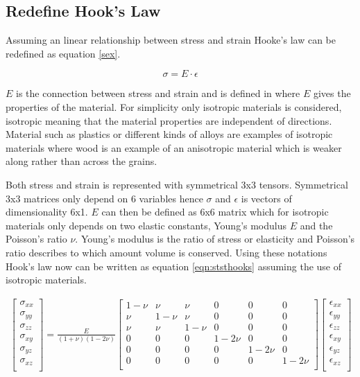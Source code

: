 \documentclass[10pt,a4paper]{article}
\begin{document}
\subsection{Redefine Hook's Law}
Assuming an linear relationship between stress and strain Hooke's law can be redefined as equation \ref{sex}.

\begin{equation}\label{sex}
    \sigma = E \cdot \epsilon
\end{equation}

 $E$ is the connection between stress and strain and is defined in \cite{fem_liu} where $E$ gives the properties of the material. For simplicity only isotropic materials is considered, isotropic meaning that the material properties are independent of directions. Material such as plastics or different kinds of alloys are examples of isotropic materials where wood is an example of an anisotropic material which is weaker along rather than across the grains.

Both stress and strain is represented with symmetrical 3x3 tensors. Symmetrical 3x3 matrices only depend on 6 variables hence
$\sigma$ and $\epsilon$ is vectors of dimensionality 6x1. $E$ can then be defined as 6x6 matrix which for isotropic materials only depends on two elastic constants, Young's modulus $E$ and the Poisson's ratio $\nu$. Young's modulus is the ratio of stress or elasticity and Poisson's ratio describes to which amount volume is conserved. Using these notations Hook's law now can be written as equation \ref{eqn:ststhooks} assuming the use of isotropic materials.

\begin{eqnarray}\label{eqn:ststhooks}
\left[ \begin{array}{c}
\sigma_{xx} \\
\sigma_{yy} \\
\sigma_{zz} \\
\sigma_{xy} \\
\sigma_{yz} \\
\sigma_{xz} \\
\end{array} \right] = \frac{E}{(1+\nu)(1-2\nu)}
\left[ \begin{array}{cccccc}
1-\nu & \nu & \nu & 0 & 0 & 0\\
\nu & 1-\nu & \nu & 0 & 0 & 0\\
\nu & \nu & 1-\nu & 0 & 0 & 0\\
0 & 0 & 0 & 1-2\nu & 0 & 0\\
0 & 0 & 0 & 0 & 1-2\nu & 0\\
0 & 0 & 0 & 0 & 0 & 1-2\nu\\
 \end{array} \right]
\left[ \begin{array}{c}
\epsilon_{xx} \\
\epsilon_{yy} \\
\epsilon_{zz} \\
\epsilon_{xy} \\
\epsilon_{yz} \\
\epsilon_{xz} \\
\end{array} \right]
\end{eqnarray}
\end{document}
